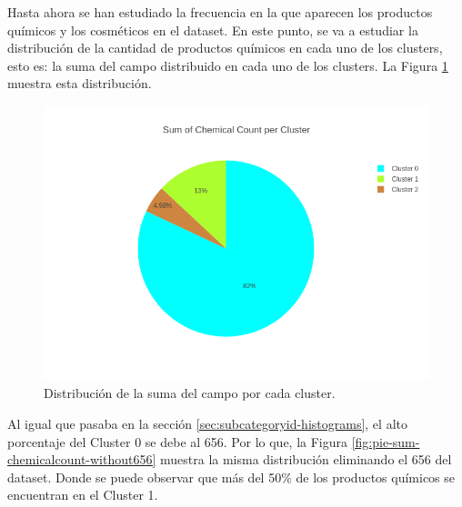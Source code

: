 Hasta ahora se han estudiado la frecuencia en la que aparecen los productos químicos y los cosméticos en el dataset. En este punto, se va a estudiar la distribución de la cantidad de productos químicos en cada uno de los clusters, esto es: la suma del campo  distribuido en cada uno de los clusters. La Figura \ref{fig:pie-sum-chemicalcount} muestra esta distribución.


\begin{figure}[!th]
\includegraphics[scale=0.46]{figures/pie-sum-chemicalcount}
\centering
\caption{Distribución de la suma del campo  por cada cluster.}
\label{fig:pie-sum-chemicalcount}
\end{figure}

Al igual que pasaba en la sección \ref{sec:subcategoryid-histograms}, el alto porcentaje del Cluster 0 se debe al  656. Por lo que, la Figura \ref{fig:pie-sum-chemicalcount-without656} muestra la misma distribución eliminando el  656 del dataset. Donde se puede observar que más del 50\% de los productos químicos se encuentran en el Cluster 1.

